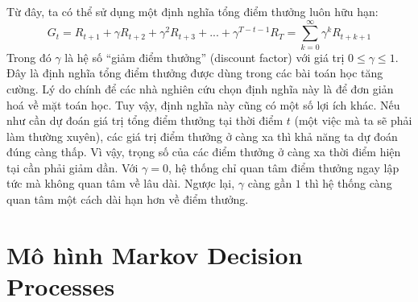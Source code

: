 Từ đây, ta có thể sử dụng một định nghĩa tổng điểm thưởng luôn hữu hạn:
\begin{equation}
\mathit{G_t} = \mathit{R_{t+1}} + \gamma\mathit{R_{t+2}} + \gamma^{2}\mathit{R_{t+3}} + ... + \gamma^{T-t-1}\mathit{R_{T}} = \sum_{k=0}^{\infty}\gamma^{k}\mathit{R_{t+k+1}}
\end{equation}
Trong đó $\gamma$ là hệ số ``giảm điểm thưởng'' (discount factor) với giá trị $0\leqslant \gamma \leqslant 1$.
Đây là định nghĩa tổng điểm thưởng được dùng trong các bài toán học tăng cường.
Lý do chính để các nhà nghiên cứu chọn định nghĩa này là để đơn giản hoá về mặt toán học.
Tuy vậy, định nghĩa này cũng có một số lợi ích khác.
Nếu như cần dự đoán giá trị tổng điểm thưởng tại thời điểm $t$ (một việc mà ta sẽ phải làm thường xuyên), các giá trị điểm thưởng ở càng xa thì khả năng ta dự đoán đúng càng thấp.
Vì vậy, trọng số của các điểm thưởng ở càng xa thời điểm hiện tại cần phải giảm dần.
Với $\gamma = 0$, hệ thống chỉ quan tâm điểm thưởng ngay lập tức mà không quan tâm về lâu dài.
Ngược lại, $\gamma$ càng gần $1$ thì hệ thống càng quan tâm một cách dài hạn hơn về điểm thưởng.

\section{Mô hình Markov Decision Processes}
